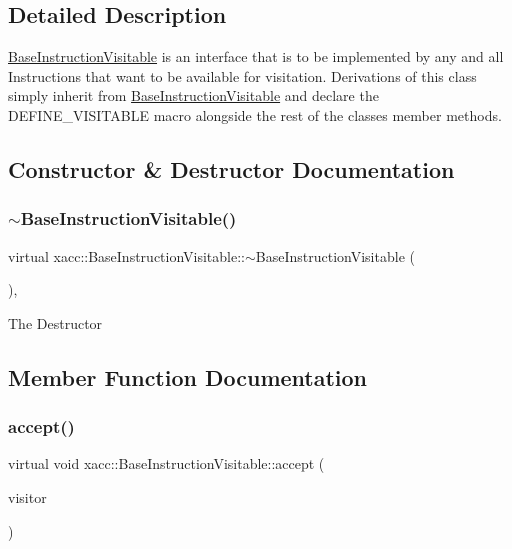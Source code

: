 \subsection{Detailed Description}
\hyperlink{a02476}{Base\+Instruction\+Visitable} is an interface that is to be implemented by any and all Instructions that want to be available for visitation. Derivations of this class simply inherit from \hyperlink{a02476}{Base\+Instruction\+Visitable} and declare the D\+E\+F\+I\+N\+E\+\_\+\+V\+I\+S\+I\+T\+A\+B\+LE macro alongside the rest of the classes member methods. 

\subsection{Constructor \& Destructor Documentation}
\mbox{\label{a02476_a3a291d247b18ea7620dd8d97dfb595f4}} 
\subsubsection{\texorpdfstring{$\sim$\+Base\+Instruction\+Visitable()}{~BaseInstructionVisitable()}}
{\footnotesize\ttfamily virtual xacc\+::\+Base\+Instruction\+Visitable\+::$\sim$\+Base\+Instruction\+Visitable (\begin{DoxyParamCaption}{ }\end{DoxyParamCaption})\hspace{0.3cm}{\ttfamily [inline]}, {\ttfamily [virtual]}}

The Destructor 

\subsection{Member Function Documentation}
\mbox{\label{a02476_a4ae295a7f83d57c6f1f912adc90274ea}} 
\subsubsection{\texorpdfstring{accept()}{accept()}\hspace{0.1cm}{\footnotesize\ttfamily [1/2]}}
{\footnotesize\ttfamily virtual void xacc\+::\+Base\+Instruction\+Visitable\+::accept (\begin{DoxyParamCaption}\item[{std\+::shared\+\_\+ptr$<$ \hyperlink{a02468}{Base\+Instruction\+Visitor} $>$}]{visitor }\end{DoxyParamCaption})\hspace{0.3cm}{\ttfamily [pure virtual]}}

